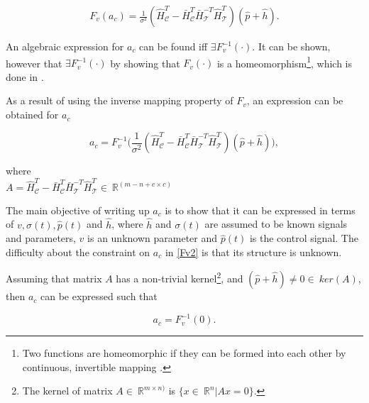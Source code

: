 \begin{equation}
\begin{split}
\label{Fv1}
F_v(a_c) = \frac{1}{\sigma^2} (\hat{H}^T_{\mathcal{C}} -\bar{H}^T_{\mathcal{C}}\bar{H}^{-T}_{\mathcal{T}}\hat{H}^T_{\mathcal{T}})(\hat{p} + \hat{h}).
\end{split}
\end{equation}

An algebraic expression for $a_c$ can be found iff $\exists F_v^{-1}(\cdot)$. It can be shown, however that $\exists F_v^{-1}(\cdot)$ by showing that $F_v(\cdot)$ is a homeomorphism\footnote{Two functions are homeomorphic if they can be formed into each other by continuous, invertible mapping \cite{krantz2012handbook}.}, which is done in \cite{oneinput_paper}.  

As a result of using the inverse mapping property of $F_v$, an expression can be obtained for $a_c$

\begin{equation}
\label{Fv2}
a_c = F_v^{-1} \Big(\frac{1}{\sigma^2} (\hat{H}^T_{\mathcal{C}} -\bar{H}^T_{\mathcal{C}}\bar{H}^{-T}_{\mathcal{T}}\hat{H}^T_{\mathcal{T}})(\hat{p} + \hat{h}) \Big),
\end{equation}

  \begin{minipage}[t]{0.60\textwidth}
where\\
\hspace*{8mm} $A = \hat{H}^T_{\mathcal{C}} -\bar{H}^T_{\mathcal{C}}\bar{H}^{-T}_{\mathcal{T}}\hat{H}^T_{\mathcal{T}}\in \: \mathbb{R}^{(m-n+c \times c)}$ 
\end{minipage}


The main objective of writing up $a_c$ is to show that it can be expressed in terms of $v, \sigma(t), \hat{p}(t)$ and $\hat{h}$, where $\hat{h}$ and $\sigma(t)$ are assumed to be known signals and parameters, $v$ is an unknown parameter and $\hat{p}(t)$ is the control signal. The difficulty about the constraint on $a_c$ in \eqref{Fv2} is that its structure is unknown.  

Assuming that matrix $A$ has a non-trivial kernel\footnote{The kernel of matrix $A \in \: \mathbb{R}^{m \times n)}$ is $ \{x \in \: \mathbb{R}^{n} | Ax = 0 \} $.}, and $(\hat{p} + \hat{h}) \neq 0 \in \: ker(A)$, then $a_c$ can be expressed such that 

\begin{equation}
\label{Fv3}
a_c = F_v^{-1} (0).
\end{equation}

